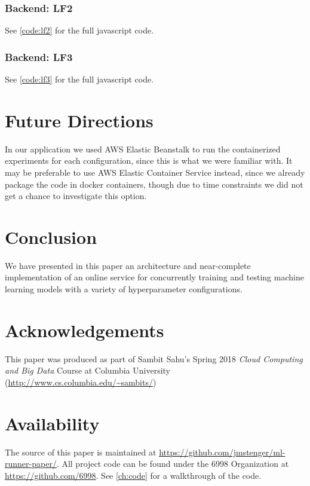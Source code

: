 \documentclass[12pt,oneside]{amsart}
\begin{document}
\subsubsection{Backend: LF2}
See \ref{code:lf2} for the full javascript code.

\subsubsection{Backend: LF3}
See \ref{code:lf3} for the full javascript code.

\begin{multicols}{2}
\section{Future Directions} \label{ch:future}
In our application we used AWS Elastic Beanstalk to run the containerized experiments for each configuration, since this is what we were familiar with.
It may be preferable to use AWS Elastic Container Service instead, since we already package the code in docker containers, though due to time constraints we did not get a chance to investigate this option.

\section{Conclusion} \label{ch:conclusion}
We have presented in this paper an architecture and near-complete implementation of an online service for concurrently training and testing machine learning models with a variety of hyperparameter configurations.

\section{Acknowledgements}
This paper was produced as part of Sambit Sahu's Spring 2018
\textit{Cloud Computing and Big Data} Course at Columbia University (\url{http://www.cs.columbia.edu/~sambits/})

\section{Availability}
The source of this paper is maintained at \url{https://github.com/jmstenger/ml-runner-paper/}.
All project code can be found under the 6998 Organization at \url{https://github.com/6998}.
See \ref{ch:code} for a walkthrough of the code.

\end{multicols}


\end{document}
